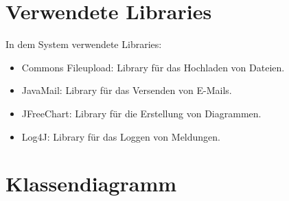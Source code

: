 	
	
	
	\section{Verwendete Libraries}
	In dem System verwendete Libraries:
	\begin{itemize}
		\item Commons Fileupload: Library für das Hochladen von Dateien.
		\item JavaMail: Library für das Versenden von E-Mails.
		\item JFreeChart: Library für die Erstellung von Diagrammen.
		\item Log4J: Library für das Loggen von Meldungen.
	\end{itemize}
	\section{Klassendiagramm}
